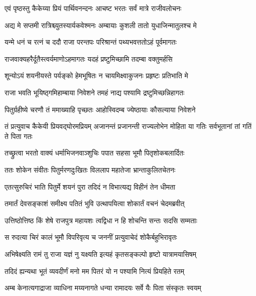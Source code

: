 \twolineshloka
{एवं पृष्ठस्तु कैकेय्या प्रियं पार्थिवनन्दनः}
{आचष्ट भरतः सर्वं मात्रे राजीवलोचनः} %

\twolineshloka
{अद्य मे सप्तमी रात्रिश्च्युतस्यार्यकवेश्मनः}
{अम्बायाः कुशली तातो युधाजिन्मातुलश्च मे} %

\twolineshloka
{यन्मे धनं च रत्नं च ददौ राजा परन्तपः}
{परिश्रान्तं पथ्यभवत्ततोऽहं पूर्वमागतः} %

\twolineshloka
{राजवाक्यहरैर्दूतैस्त्वर्यमाणोऽहमागतः}
{यदहं प्रष्टुमिच्छामि तदम्बा वक्तुमर्हसि} %

\twolineshloka
{शून्योऽयं शयनीयस्ते पर्यङ्को हेमभूषितः}
{न चायमिक्ष्वाकुजनः प्रहृष्टः प्रतिभाति मे} %

\twolineshloka
{राजा भवति भूयिष्ठ्गमिहाम्बाया निवेशने}
{तमहं नाद्य पश्यामि द्रष्टुमिच्छन्निहागतः} %

\twolineshloka
{पितुर्ग्रहीष्ये चरणौ तं ममाख्याहि पृच्छतः}
{आहोस्विदम्ब ज्येष्ठायाः कौसल्याया निवेशने} %

\threelineshloka
{तं प्रत्युवाच कैकेयी प्रियवद्घोरमप्रियम्}
{अजानन्तं प्रजानन्ती राज्यलोभेन मोहिता}
{या गतिः सर्वभूतानां तां गतिं ते पिता गतः} %

\twolineshloka
{तच्छ्रुत्वा भरतो वाक्यं धर्माभिजनवाञ्शुचिः}
{पपात सहसा भूमौ पितृशोकबलार्दितः} %

\twolineshloka
{ततः शोकेन संवीतः पितुर्मरणदुःखितः}
{विललाप महातेजा भ्रान्ताकुलितचेतनः} %

\twolineshloka
{एतत्सुरुचिरं भाति पितुर्मे शयनं पुरा}
{तदिदं न विभात्यद्य विहीनं तेन धीमता} %

\twolineshloka
{तमार्तं देवसङ्काशं समीक्ष्य पतितं भुवि}
{उत्थापयित्वा शोकार्तं वचनं चेदमब्रवीत्} %

\twolineshloka
{उत्तिष्ठोत्तिष्ठ किं शेषे राजपुत्र महायशः}
{त्वद्विधा न हि शोचन्ति सन्तः सदसि सम्मताः} %

\twolineshloka
{स रुदत्या चिरं कालं भूमौ विपरिवृत्य च}
{जननीं प्रत्युवाचेदं शोकैर्बहुभिरावृतः} %

\twolineshloka
{अभिषेक्ष्यति रामं तु राजा यज्ञं नु यक्ष्यति}
{इत्यहं कृतसङ्कल्पो हृष्टो यात्रामयासिषम्} %

\twolineshloka
{तदिदं ह्यन्यथा भूतं व्यवदीर्णं मनो मम}
{पितरं यो न पश्यामि नित्यं प्रियहिते रतम्} %

\twolineshloka
{अम्ब केनात्यगाद्राजा व्याधिना मय्यनागते}
{धन्या रामादयः सर्वे यैः पिता संस्कृतः स्वयम्} %

